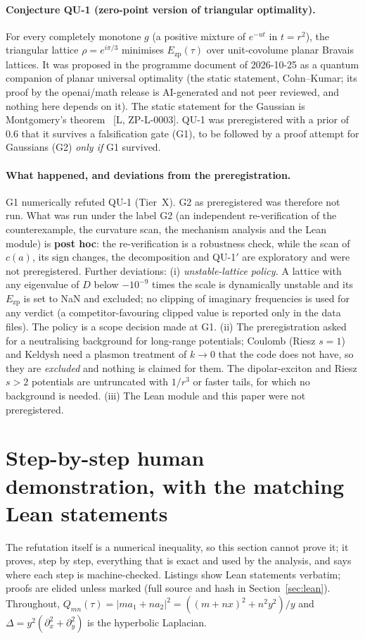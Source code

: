 \documentclass[10pt]{article}
\newcommand{\tier}[1]{\textsf{[#1]}}
\newcommand{\Ezp}{E_{\mathrm{zp}}}
\begin{document}
\paragraph{Conjecture QU-1 (zero-point version of triangular optimality).} For every completely monotone $g$ (a positive
mixture of $e^{-ut}$ in $t=r^2$), the triangular lattice $\rho=e^{i\pi/3}$ minimises $\Ezp(\tau)$ over unit-covolume planar
Bravais lattices. It was proposed in the programme document of 2026-10-25 as a quantum companion of planar universal
optimality (the static statement, Cohn--Kumar; its proof by the openai/math release is AI-generated and not peer reviewed,
and nothing here depends on it). The static statement for the Gaussian is Montgomery's theorem~\cite{mont,dengluo}
\tier{L, ZP-L-0003}. QU-1 was preregistered with a prior of $0.6$ that it survives a falsification gate (G1), to be followed by a
proof attempt for Gaussians (G2) \emph{only if} G1 survived.

\paragraph{What happened, and deviations from the preregistration.} G1 numerically refuted QU-1 (Tier~X). G2 as preregistered was therefore not run.
What was run under the label G2 (an independent re-verification of the counterexample, the curvature scan, the mechanism
analysis and the Lean module) is \textbf{post hoc}: the re-verification is a robustness check, while the scan of $c(a)$, its
sign changes, the decomposition and QU-1$'$ are exploratory and were not preregistered. Further deviations: (i) \emph{unstable-lattice
policy.} A lattice with any eigenvalue of $D$ below $-10^{-9}$ times the scale is dynamically unstable and its $\Ezp$ is set
to NaN and excluded; no clipping of imaginary frequencies is used for any verdict (a competitor-favouring clipped value is
reported only in the data files). The policy is a scope decision made at G1. (ii) The preregistration asked for a neutralising background
for long-range potentials; Coulomb (Riesz $s=1$) and Keldysh need a plasmon treatment of $k\to0$ that the code does not have, so
they are \emph{excluded} and nothing is claimed for them. The dipolar-exciton and Riesz $s>2$ potentials are untruncated with
$1/r^3$ or faster tails, for which no background is needed. (iii) The Lean module and this paper were not preregistered.

\section{Step-by-step human demonstration, with the matching Lean statements}\label{sec:human}
The refutation itself is a numerical inequality, so this section cannot prove it; it proves, step by step, everything that is
exact and used by the analysis, and says where each step is machine-checked. Listings show Lean statements verbatim; proofs are elided
unless marked (full source and hash in Section~\ref{sec:lean}). Throughout, $Q_{mn}(\tau)=|ma_1+na_2|^2=((m+nx)^2+n^2y^2)/y$ and
$\Delta=y^2(\partial_x^2+\partial_y^2)$ is the hyperbolic Laplacian.
\end{document}
